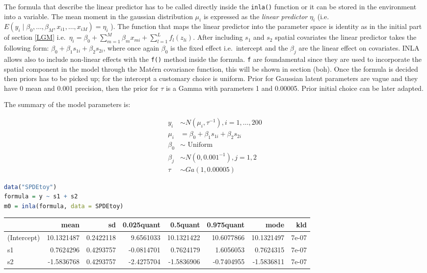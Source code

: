 \documentclass[
  12pt,
  a4paper,
  oneside]{book}
\newcommand{\passthrough}[1]{#1}
\theoremstyle{definition}
\theoremstyle{definition}
\theoremstyle{definition}
\theoremstyle{remark}
\begin{document}
The formula that describe the linear predictor has to be called directly inside the \passthrough{\lstinline!inla()!} function or it can be stored in the environment into a variable. The mean moment in the gaussian distribution \(\mu_{i}\) is expressed as the \emph{linear predictor} \(\eta_{i}\) (i.e.~\(E\left(y_{i} \mid \beta_{0}, \ldots, \beta_{M}, x_{i 1}, \ldots, x_{i M}\right) = \eta_{i}\) ). The function that maps the linear predictor into the parameter space is identity as in the initial part of section \ref{LGM} i.e.~\(\eta_{i}=\beta_{0}+\sum_{m=1}^{M} \beta_{m} x_{m i}+\sum_{l=1}^{L} f_{l}\left(z_{l i}\right)\).
After including \(s_{1}\) and \(s_{2}\) spatial covariates the linear predictor takes the following form: \(\beta_{0}+\beta_{1} s_{1 i}+\beta_{2} s_{2 i}\), where once again \(\beta_{0}\) is the fixed effect i.e.~intercept and the \(\beta_{j}\) are the linear effect on covariates. INLA allows also to include non-linear effects with the \passthrough{\lstinline!f()!} method inside the formula. \passthrough{\lstinline!f!} are foundamental since they are used to incorporate the spatial component in the model through the Matérn covariance function, this will be shown in section (boh).
Once the formula is decided then priors has to be picked up; for the intercept a customary choice is uniform. Prior for Gaussian latent parameters are vague and they have 0 mean and 0.001 precision, then the prior for \(\tau\) is a Gamma with parameters 1 and 0.00005. Prior initial choice can be later adapted.

The summary of the model parameters is:

\[
\begin{aligned}
y_{i} & \sim N\left(\mu_{i}, \tau^{-1}\right), i=1, \ldots, 200 \\
\mu_{i} &=\beta_{0}+\beta_{1} s_{1 i}+\beta_{2} s_{2 i} \\
\beta_{0} & \sim \text { Uniform } \\
\beta_{j} & \sim N\left(0,0.001^{-1}\right), j=1,2 \\
\tau & \sim G a(1,0.00005)
\end{aligned}
\]

\begin{lstlisting}[language=R]
data("SPDEtoy")
formula = y ~ s1 + s2
m0 = inla(formula, data = SPDEtoy)
\end{lstlisting}

\begin{tabular}{lrrrrrrr}
\toprule
  & mean & sd & 0.025quant & 0.5quant & 0.975quant & mode & kld\\
\midrule
(Intercept) & 10.1321487 & 0.2422118 & 9.6561033 & 10.1321422 & 10.6077866 & 10.1321497 & 7e-07\\
s1 & 0.7624296 & 0.4293757 & -0.0814701 & 0.7624179 & 1.6056053 & 0.7624315 & 7e-07\\
s2 & -1.5836768 & 0.4293757 & -2.4275704 & -1.5836906 & -0.7404955 & -1.5836811 & 7e-07\\
\bottomrule
\end{tabular}
\end{document}
